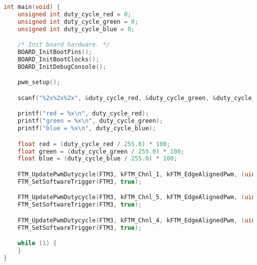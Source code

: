 \begin{lstlisting}[language=c,caption=Problem 5 main, label=list:p5_main]
int main(void) {
    unsigned int duty_cycle_red = 0;
    unsigned int duty_cycle_green = 0;
    unsigned int duty_cycle_blue = 0;

    /* Init board hardware. */
    BOARD_InitBootPins();
    BOARD_InitBootClocks();
    BOARD_InitDebugConsole();

    pwm_setup();

    scanf("%2x%2x%2x", &duty_cycle_red, &duty_cycle_green, &duty_cycle_blue);

    printf("red = %x\n", duty_cycle_red);
    printf("green = %x\n", duty_cycle_green);
    printf("blue = %x\n", duty_cycle_blue);

    float red = (duty_cycle_red / 255.0) * 100;
    float green = (duty_cycle_green / 255.0) * 100;
    float blue = (duty_cycle_blue / 255.0) * 100;

    FTM_UpdatePwmDutycycle(FTM3, kFTM_Chnl_1, kFTM_EdgeAlignedPwm, (uint8_t)red);
    FTM_SetSoftwareTrigger(FTM3, true);

    FTM_UpdatePwmDutycycle(FTM3, kFTM_Chnl_5, kFTM_EdgeAlignedPwm, (uint8_t)green);
    FTM_SetSoftwareTrigger(FTM3, true);

    FTM_UpdatePwmDutycycle(FTM3, kFTM_Chnl_4, kFTM_EdgeAlignedPwm, (uint8_t)blue);
    FTM_SetSoftwareTrigger(FTM3, true);

    while (1) {
    }
}
\end{lstlisting}